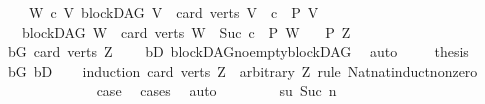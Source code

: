\begin{isabellebody}
\ \ \ \ {\isachardoublequoteopen}{\isasymAnd}W\ c{\isachardot}{\kern0pt}\ {\isacharparenleft}{\kern0pt}{\isasymAnd}V{\isachardot}{\kern0pt}\ {\isacharparenleft}{\kern0pt}blockDAG\ V\ {\isasymLongrightarrow}\ card\ {\isacharparenleft}{\kern0pt}verts\ V{\isacharparenright}{\kern0pt}\ {\isacharequal}{\kern0pt}\ c\ {\isasymLongrightarrow}\ P\ V{\isacharparenright}{\kern0pt}{\isacharparenright}{\kern0pt}\ \isanewline
\ \ {\isasymLongrightarrow}\ {\isacharparenleft}{\kern0pt}blockDAG\ W\ {\isasymLongrightarrow}\ card\ {\isacharparenleft}{\kern0pt}verts\ W{\isacharparenright}{\kern0pt}\ {\isacharequal}{\kern0pt}\ Suc\ c\ {\isasymLongrightarrow}\ P\ W{\isacharparenright}{\kern0pt}{\isachardoublequoteclose}\isanewline
\ \ \ {\isachardoublequoteopen}P\ Z{\isachardoublequoteclose}\isanewline
%
\isadelimproof
%
\endisadelimproof
%
\isatagproof
{}\isamarkupfalse%
\ {\isacharminus}{\kern0pt}\ \isanewline
\ \ \isamarkupfalse%
\ bG{\isacharcolon}{\kern0pt}\ {\isachardoublequoteopen}card\ {\isacharparenleft}{\kern0pt}verts\ Z{\isacharparenright}{\kern0pt}\ {\isachargreater}{\kern0pt}\ {}{\isachardoublequoteclose}\ \isamarkupfalse%
\ bD\ blockDAG{\isachardot}{\kern0pt}no{\isacharunderscore}{\kern0pt}empty{\isacharunderscore}{\kern0pt}blockDAG\ \isamarkupfalse%
\ auto\ \isanewline
\ \ \isamarkupfalse%
\ {\isachardoublequoteopen}{\isacharquery}{\kern0pt}thesis{\isachardoublequoteclose}\isanewline
\ \ \ \ \isamarkupfalse%
\ bG\ bD\isanewline
\ \ \isamarkupfalse%
\ {\isacharparenleft}{\kern0pt}induction\ {\isachardoublequoteopen}card\ {\isacharparenleft}{\kern0pt}verts\ Z{\isacharparenright}{\kern0pt}{\isachardoublequoteclose}\ \ arbitrary{\isacharcolon}{\kern0pt}\ Z\ rule{\isacharcolon}{\kern0pt}\ Nat{\isachardot}{\kern0pt}nat{\isacharunderscore}{\kern0pt}induct{\isacharunderscore}{\kern0pt}non{\isacharunderscore}{\kern0pt}zero{\isacharparenright}{\kern0pt}\isanewline
\ \ \ \ \isamarkupfalse%
\ {}\isanewline
\ \ \ \ \isamarkupfalse%
\ \isamarkupfalse%
\ {\isacharquery}{\kern0pt}case\ \isamarkupfalse%
\ cases{\isacharparenleft}{\kern0pt}{}{\isacharparenright}{\kern0pt}\ \isamarkupfalse%
\ auto\isanewline
\ \ \isamarkupfalse%
\isanewline
\ \ \ \ \isamarkupfalse%
\ su{\isacharcolon}{\kern0pt}\ {\isacharparenleft}{\kern0pt}Suc\ n{\isacharparenright}{\kern0pt}\isanewline
\ \ \ \ \isamarkupfalse%

\end{isabellebody}
